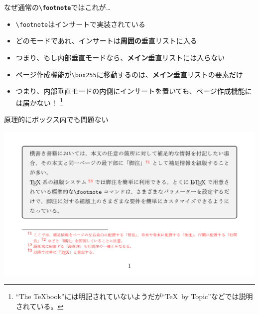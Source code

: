 \documentclass[unicode,14pt]{beamer}
\def\bftncm{\texttt{\bfseries\textbackslash{}footnote}}
\def\nftncm{\texttt{\textbackslash{}footnote}}
\begin{document}
\begin{frame}[t]{なぜ通常の\bftncm{}ではこれが…}
\begin{itemize}
\item \nftncm{}はインサートで実装されている
\item どのモードであれ、インサートは\textbf{周囲の}垂直リストに入る
\item つまり、もし内部垂直モードなら、\textbf{メイン}垂直リストには入らない
\end{itemize}
\begin{itemize}
\item ページ作成機能が\texttt{\textbackslash{}box255}に移動するのは、\textbf{メイン}垂直リストの要素だけ
\item つまり、内部垂直モードの内側にインサートを置いても、ページ作成機能には届かない！
  \footnote{``The \TeX{}book''には明記されていないようだが``\TeX\ by Topic''などでは説明されている。}
\end{itemize}
\end{frame}

\begin{frame}[t]{原理的にボックス内でも問題ない}
\begin{center}
\colorbox{white}{\includegraphics[width=.9\textwidth]{codes/history4.pdf}}
\end{center}
\end{frame}
\end{document}
